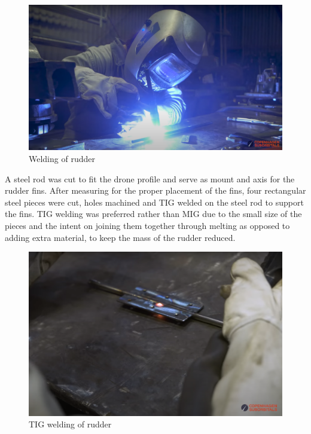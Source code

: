 \begin{figure}[h!]
  \centering
  \includegraphics[scale=0.4]{graphics/rudderweld.png}
  \caption{Welding of rudder}
  \label{fig:Rudder TIG welding}
\end{figure}

A steel rod was cut to fit the drone profile and serve as mount and axis for the rudder fins. After measuring for the proper placement of the fins, four rectangular steel pieces were cut, holes machined and TIG welded on the steel rod to support the fins. TIG welding was preferred rather than MIG due to the small size of the pieces and the intent on joining them together through melting as opposed to adding extra material, to keep the mass of the rudder reduced. 

\begin{figure}[H]
  \centering
  \includegraphics[scale=0.3]{graphics/Drone/weld2.png}
  \caption{TIG welding of rudder}
  \label{fig:TIG welding of rudder}
\end{figure}


